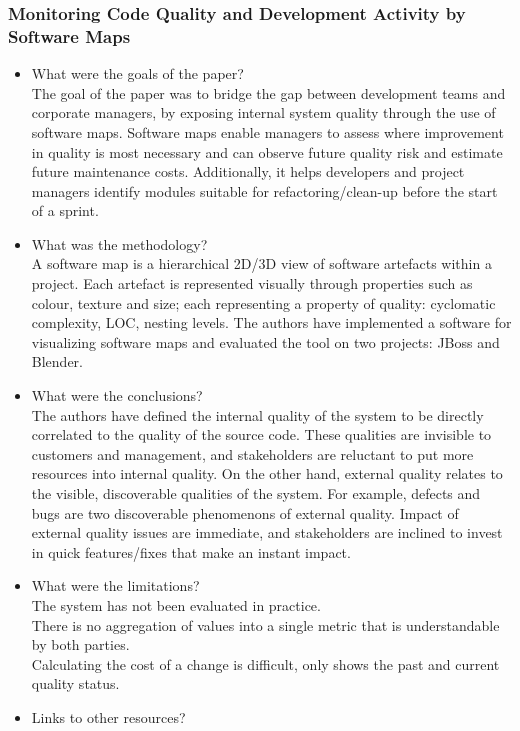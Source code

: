 \documentclass{mprop}
\begin{document}
\subsubsection{Monitoring Code Quality and Development Activity by Software
Maps} \cite{Bohnet2011}
\begin{itemize}
	\item What were the goals of the paper? \\
	      The goal of the paper was to bridge the gap between development
	      teams and corporate managers, by exposing internal system quality
	      through the use of software maps. Software maps enable managers to
	      assess where improvement in quality is most necessary and can
	      observe future quality risk and estimate future maintenance costs.
	      Additionally, it helps developers and project managers identify
	      modules suitable for refactoring/clean-up before the start of a
	      sprint.
	\item What was the methodology? \\
	      A software map is a hierarchical 2D/3D view of software artefacts
	      within a project. Each artefact is represented visually through
	      properties such as colour, texture and size; each representing a
	      property of quality: cyclomatic complexity, LOC, nesting levels. The
	      authors have implemented a software for visualizing software maps
	      and evaluated the tool on two projects: JBoss and Blender.
	\item What were the conclusions? \\
	      The authors have defined the internal quality of the system to be
	      directly correlated to the quality of the source code. These
	      qualities are invisible to customers and management, and
	      stakeholders are reluctant to put more resources into internal
	      quality. On the other hand, external quality relates to the visible,
	      discoverable qualities of the system. For example, defects and bugs
	      are two discoverable phenomenons of external quality. Impact of
	      external quality issues are immediate, and stakeholders are inclined
	      to invest in quick features/fixes that make an instant impact.
	\item What were the limitations? \\
	      The system has not been evaluated in practice.\\
	      There is no aggregation of values into a single metric that is
	      understandable by both parties.\\
	      Calculating the cost of a change is difficult, only shows the past
	      and current quality status.
	\item Links to other resources? \\
\end{itemize}
\end{document}
